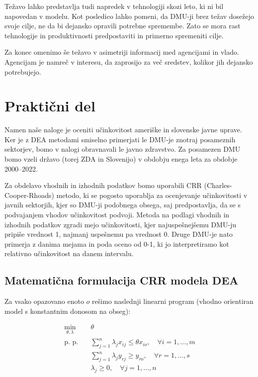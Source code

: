 \documentclass[12pt,a4paper]{article}
\theoremstyle{definition}
\begin{document}
Težavo lahko predstavlja tudi napredek v tehnologiji
skozi leto, ki ni bil napovedan v modelu. Kot posledico
lahko pomeni, da DMU-ji brez težav dosežejo svoje cilje,
ne da bi dejansko opravili potrebne spremembe. Zato se
mora rast tehnologije in produktivnosti predpostaviti 
in primerno spremeniti cilje.

Za konec omenimo še težavo v asimetriji informacij med
agencijami in vlado. Agencijam je namreč v interesu,
da zaprosijo za več sredstev, kolikor jih dejansko 
potrebujejo. 

\section{Praktični del}

Namen naše naloge je oceniti učinkovitost ameriške in slovenske
javne uprave. Ker je z DEA metodami smiselno
primerjati le DMU-je znotraj posameznih sektorjev, bomo v nalogi obravnavali le
javno zdravstvo. Za posamezen DMU bomo vzeli državo (torej ZDA in Slovenijo) v obdobju 
enega leta za obdobje 2000--2022.

Za obdelavo vhodnih in izhodnih podatkov bomo uporabili CRR 
(Charles-Cooper-Rhoads) metodo, ki se pogosto uporablja za 
ocenjevanje učinkovitosti v javnih sektorjih, kjer so DMU-ji podobnega obsega, saj 
predpostavlja, da se s podvajanjem vhodov učinkovitost podvoji. 
Metoda na podlagi vhodnih in izhodnih podatkov zgradi mejo učinkovitosti, kjer najuspešnejšemu DMU-ju pripiše vrednost 1,
najmanj uspešnemu pa vrednost 0. Druge DMU-je nato primerja z danima mejama in poda oceno od 0-1, ki jo
interpretiramo kot relativno učinkovitost na danem intervalu.

\subsection{Matematična formulacija CRR modela DEA}

Za vsako opazovano enoto \( o \) rešimo naslednji linearni program (vhodno orientiran model s konstantnim donosom na obseg):

\begin{align*}
\min_{\theta, \lambda} \quad & \theta \\
\text{p. p.} \quad 
& \sum_{j=1}^{n} \lambda_j x_{ij} \leq \theta x_{io}, \quad \forall i = 1, \dots, m \\
& \sum_{j=1}^{n} \lambda_j y_{rj} \geq y_{ro}, \quad \forall r = 1, \dots, s \\
& \lambda_j \geq 0, \quad \forall j = 1, \dots, n
\end{align*}
\end{document}

